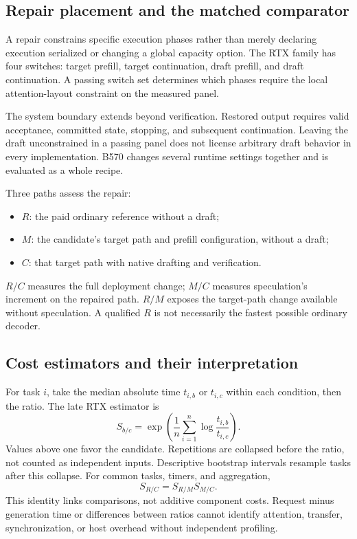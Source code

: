 \subsection{Repair placement and the matched comparator}
A repair constrains specific execution phases rather than merely declaring execution serialized or changing a global capacity option. The RTX family has four switches: target prefill, target continuation, draft prefill, and draft continuation. A passing switch set determines which phases require the local attention-layout constraint on the measured panel.

The system boundary extends beyond verification. Restored output requires valid acceptance, committed state, stopping, and subsequent continuation. Leaving the draft unconstrained in a passing panel does not license arbitrary draft behavior in every implementation. B570 changes several runtime settings together and is evaluated as a whole recipe.

Three paths assess the repair:
\begin{itemize}
\item $R$: the paid ordinary reference without a draft;
\item $M$: the candidate's target path and prefill configuration, without a draft;
\item $C$: that target path with native drafting and verification.
\end{itemize}
$R/C$ measures the full deployment change; $M/C$ measures speculation's increment on the repaired path. $R/M$ exposes the target-path change available without speculation. A qualified $R$ is not necessarily the fastest possible ordinary decoder.

\subsection{Cost estimators and their interpretation}
For task $i$, take the median absolute time $t_{i,b}$ or $t_{i,c}$ within each condition, then the ratio. The late RTX estimator is
\begin{equation}
S_{b/c}=\exp\left(\frac{1}{n}\sum_{i=1}^{n}\log\frac{t_{i,b}}{t_{i,c}}\right).
\label{eq:gm}
\end{equation}
Values above one favor the candidate. Repetitions are collapsed before the ratio, not counted as independent inputs. Descriptive bootstrap intervals resample tasks after this collapse. For common tasks, timers, and aggregation,
\begin{equation}
S_{R/C}=S_{R/M}S_{M/C}.
\label{eq:identity}
\end{equation}
This identity links comparisons, not additive component costs. Request minus generation time or differences between ratios cannot identify attention, transfer, synchronization, or host overhead without independent profiling.

